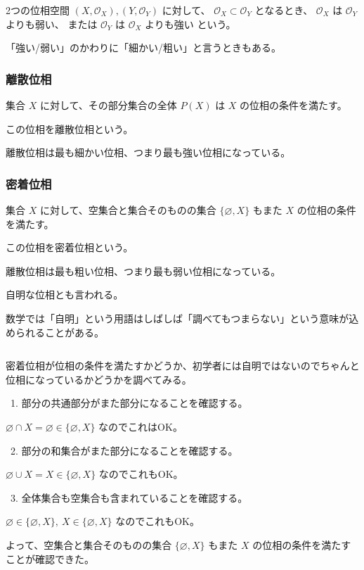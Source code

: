 \documentclass[uplatex,a4j,12pt,dvipdfmx]{jsarticle}
\begin{document}
2つの位相空間 $(X, {\mathcal O}_{X}), (Y, {\mathcal O}_{Y})$ に対して、
${\mathcal O}_{X} \subset {\mathcal O}_{Y}$
となるとき、
${\mathcal O}_{X}$ は ${\mathcal O}_{Y}$ よりも弱い、
または ${\mathcal O}_{Y}$ は ${\mathcal O}_{X}$ よりも強い
という。

「強い/弱い」のかわりに「細かい/粗い」と言うときもある。


\subsubsection{離散位相}

集合 $X$ に対して、その部分集合の全体 $P(X)$ は $X$ の位相の条件を満たす。

この位相を離散位相という。

離散位相は最も細かい位相、つまり最も強い位相になっている。


\subsubsection{密着位相}

集合 $X$ に対して、空集合と集合そのものの集合 $\{ \varnothing, X \}$ もまた $X$ の位相の条件を満たす。

この位相を密着位相という。

離散位相は最も粗い位相、つまり最も弱い位相になっている。

自明な位相とも言われる。

数学では「自明」という用語はしばしば「調べてもつまらない」という意味が込められることがある。

${}$

密着位相が位相の条件を満たすかどうか、初学者には自明ではないのでちゃんと位相になっているかどうかを調べてみる。

\ 1. 部分の共通部分がまた部分になることを確認する。

$\varnothing \cap X = \varnothing \in \{ \varnothing, X \}$
なのでこれはOK。

\ 2. 部分の和集合がまた部分になることを確認する。

$\varnothing \cup X = X \in \{ \varnothing, X \}$
なのでこれもOK。

\ 3. 全体集合も空集合も含まれていることを確認する。

$\varnothing \in \{ \varnothing, X \} , \ X \in \{ \varnothing, X \}$
なのでこれもOK。

よって、空集合と集合そのものの集合 $\{ \varnothing, X \}$ もまた $X$ の位相の条件を満たすことが確認できた。
\end{document}
